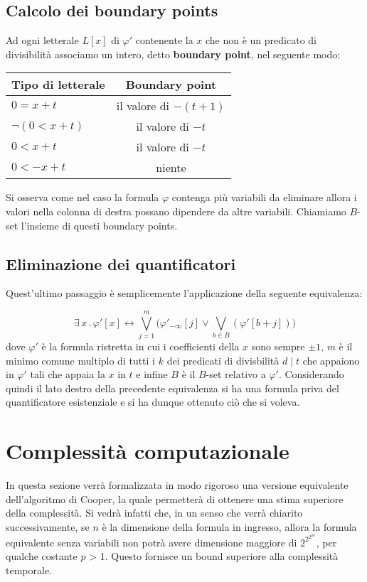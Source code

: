 \documentclass[11pt,letterpaper,twoside]{article}
\begin{document}
\subsection{Calcolo dei boundary points} Ad ogni letterale $L[x]$ di $\varphi '$
contenente la $x$ che non è un predicato di divisibilit\`a associamo un intero,
detto \textbf{boundary point}, nel seguente modo:

\begin{center}
  \begin{tabular}{ l | c }
    Tipo di letterale & Boundary point \\ \hline
    $0=x+t$ & il valore di $-(t + 1)$ \\
    $\lnot (0 < x+t)$ & il valore di $-t$ \\
    $0 < x + t$ & il valore di $-t$ \\
    $0 < -x + t$ &  niente
  \end{tabular}
\end{center}

Si osserva come nel caso la formula $\varphi$ contenga più variabili da
eliminare allora i valori nella colonna di destra possano dipendere da altre
variabili.  Chiamiamo $B$-set l'insieme di questi boundary points.

\subsection{Eliminazione dei quantificatori} Quest'ultimo passaggio è
semplicemente l'applicazione della seguente equivalenza\autocite{cooper}:

$$ \exists \, x \, . \, \varphi'[x] \longleftrightarrow \bigvee_{j=1}^m \Big(
\varphi'_{- \infty}[j] \lor \bigvee_{b \in B}(\varphi'[b+j]) \Big)$$ dove
$\varphi'$ è la formula ristretta in cui i coefficienti della $x$ sono sempre
$\pm 1$, $m$ è il minimo comune multiplo di tutti i $k$ dei predicati di
divisbilit\`a $d \mid t$ che appaiono in $\varphi'$ tali che appaia la $x$ in $t$
e infine $B$ \`e il $B$-set relativo a $\varphi'$.  Considerando quindi il lato
destro della precedente equivalenza si ha una formula priva del quantificatore
esistenziale e si ha dunque ottenuto ciò che si voleva.

\newpage

\section{Complessità computazionale}
In questa sezione verrà formalizzata in modo rigoroso una versione equivalente
dell'algoritmo di Cooper, la quale permetterà di ottenere una stima superiore
della complessità.
Si vedrà infatti che, in un senso che verrà chiarito successivamente, se $n$ è
la dimensione della formula in ingresso, allora la formula equivalente senza
variabili non potrà avere dimensione maggiore di $2^{2^{2^{pn}}}$, per qualche
costante $p$ > 1. Questo fornisce un bound superiore alla complessità temporale.
\end{document}
